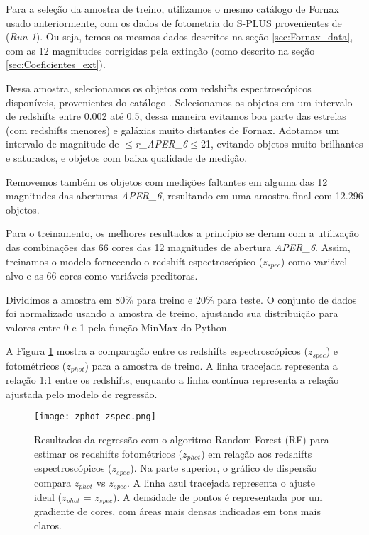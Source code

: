 Para a seleção da amostra de treino, utilizamos o mesmo catálogo de Fornax usado anteriormente, com os dados de fotometria do S-PLUS provenientes de \cite{haack2024splusfornaxprojectsfp} (\textit{Run 1}). Ou seja, temos os mesmos dados descritos na seção \ref{sec:Fornax_data}, com as 12 magnitudes corrigidas pela extinção (como descrito na seção \ref{sec:Coeficientes_ext}).

Dessa amostra, selecionamos os objetos com redshifts espectroscópicos disponíveis, provenientes do catálogo \cite{Lima_2024}. Selecionamos os objetos em um intervalo de redshifts entre 0.002 até 0.5, dessa maneira evitamos boa parte das estrelas (com redshifts menores) e galáxias muito distantes de Fornax. Adotamos um intervalo de magnitude de $\leq$\textit{r\_APER\_6}$\leq$21, evitando objetos muito brilhantes e saturados, e objetos com baixa qualidade de medição.

Removemos também os objetos com medições faltantes em alguma das 12 magnitudes das aberturas \textit{APER\_6}, resultando em uma amostra final com 12.296 objetos.

Para o treinamento, os melhores resultados a princípio se deram com a utilização das combinações das 66 cores das 12 magnitudes de abertura \textit{APER\_6}. Assim, treinamos o modelo fornecendo o redshift espectroscópico (\textit{$z_{spec}$}) como variável alvo e as 66 cores como variáveis preditoras.

Dividimos a amostra em 80\% para treino e 20\% para teste. O conjunto de dados foi normalizado usando a amostra de treino, ajustando sua distribuição para valores entre 0 e 1 pela função MinMax do Python. 

A Figura \ref{zphot_zspec} mostra a comparação entre os redshifts espectroscópicos (\textit{$z_{spec}$}) e fotométricos (\textit{$z_{phot}$}) para a amostra de treino. A linha tracejada representa a relação 1:1 entre os redshifts, enquanto a linha contínua representa a relação ajustada pelo modelo de regressão.

\begin{figure}[!ht]
    \centering
    \texttt{[image: zphot\_zspec.png]}
    \caption[]{Resultados da regressão com o algoritmo Random Forest (RF) para estimar os redshifts fotométricos (\textit{$z_{phot}$}) em relação aos redshifts espectroscópicos (\textit{$z_{spec}$}). Na parte superior, o gráfico de dispersão compara \textit{$z_{phot}$} vs \textit{$z_{spec}$}. A linha azul tracejada representa o ajuste ideal (\textit{$z_{phot}$} = \textit{$z_{spec}$}). A densidade de pontos é representada por um gradiente de cores, com áreas mais densas indicadas em tons mais claros.}
    \label{zphot_zspec}
\end{figure}

